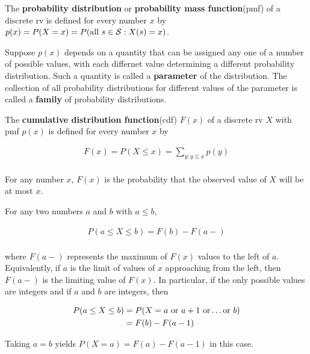 \begin{definition}
    The \textbf{probability distribution} or \textbf{probability mass function}(pmf) of a discrete rv is defined for every number $x$ by $p(x) = P(X=x)=P({\rm all}\ s\in \mathcal{S}: X(s) = x)$.
\end{definition}

\begin{definition}
    Suppose $p(x)$ depends on a quantity that can be assigned any one of a number of possible values, with each differnet value determining a different probability distribution. Such a quantity is called a \textbf{parameter} of the distribution. The collection of all probability distributions for different values of the parameter is called a \textbf{family} of probability distributions.
\end{definition}

\begin{definition}
    The \textbf{cumulative distribution function}(cdf) $F(x)$ of a discrete rv $X$ with pmf $p(x)$ is defined for every number $x$ by

    \begin{align*}
        F(x) = P(X\leq x) = \sum\limits_{y:y\leq x}p(y)\\
    \end{align*}

    For any number $x$, $F(x)$ is the probability that the observed value of $X$ will be at most $x$.
\end{definition}

\begin{proposition}
    For any two numbers $a$ and $b$ with $a\leq b$, 

    \begin{align*}
        P(a\leq X\leq b)=F(b) - F(a-)\\
    \end{align*}

    where $F(a-)$ represents the maximum of $F(x)$ values to the left of $a$. Equivalently, if $ a$ is the limit of values of $x$ approaching from the left, then $F(a-)$ is the limiting value of $F(x)$. In particular, if the only possible values are integers and if $a$ and $b$ are integers, then 

    \begin{align*}
        P(a\leq X\leq b) &=P(X=a\ {\rm or }\ a + 1\ {\rm or}\dots {\rm or}\ b)\\
        &=F(b) - F(a - 1)\\
    \end{align*}

    Taking $a=b$ yields $P(X=a)=F(a) - F(a-1)$ in this case.
\end{proposition}

